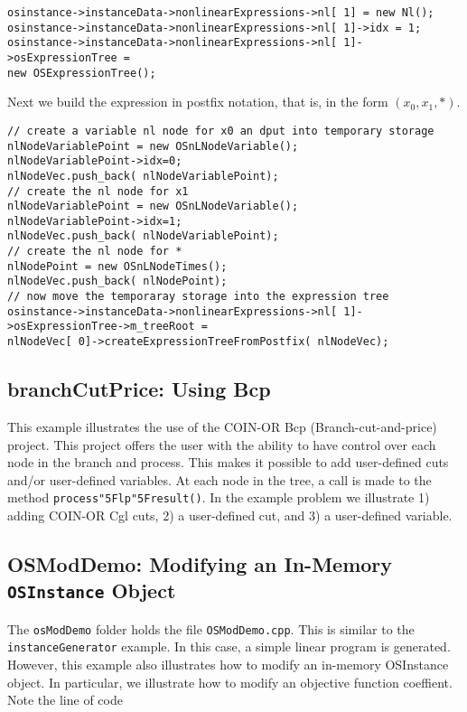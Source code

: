 \documentclass[11pt]{article}
\renewcommand{\_}{{\char"5F}}
\renewcommand{\{}{{\char"7B}}
\renewcommand{\}}{{\char"7D}}
\renewcommand{\^}{{\char"0D}}
\renewcommand{\'}{{\char"0D}}
\begin{document}
\begin{verbatim}
osinstance->instanceData->nonlinearExpressions->nl[ 1] = new Nl();
osinstance->instanceData->nonlinearExpressions->nl[ 1]->idx = 1;
osinstance->instanceData->nonlinearExpressions->nl[ 1]->osExpressionTree =
new OSExpressionTree();
\end{verbatim}

Next we build the expression in postfix notation, that is, in the form $(x_0, x_1, *)$.

\begin{verbatim}
// create a variable nl node for x0 an dput into temporary storage
nlNodeVariablePoint = new OSnLNodeVariable();
nlNodeVariablePoint->idx=0;
nlNodeVec.push_back( nlNodeVariablePoint);
// create the nl node for x1
nlNodeVariablePoint = new OSnLNodeVariable();
nlNodeVariablePoint->idx=1;
nlNodeVec.push_back( nlNodeVariablePoint);
// create the nl node for *
nlNodePoint = new OSnLNodeTimes();
nlNodeVec.push_back( nlNodePoint);
// now move the temporaray storage into the expression tree
osinstance->instanceData->nonlinearExpressions->nl[ 1]->osExpressionTree->m_treeRoot =
nlNodeVec[ 0]->createExpressionTreeFromPostfix( nlNodeVec);
\end{verbatim}





\subsection{branchCutPrice:  Using Bcp}\label{section:examplebranchCutPrice}

This example illustrates the use of the COIN-OR Bcp (Branch-cut-and-price) project.  This project offers the user with the ability to have control over each node in the branch and process. This makes it possible to add user-defined cuts and/or user-defined variables. At each node in the tree, a call is made to the method {\tt process\_lp\_result()}. In the example problem we illustrate 1) adding COIN-OR Cgl cuts, 2) a user-defined cut, and 3) a user-defined variable. 


\subsection{OSModDemo: Modifying an In-Memory {\tt OSInstance} Object}\label{section:exampleOSModDemo}

The {\tt osModDemo} folder holds the file {\tt OSModDemo.cpp}. This is similar to the {\tt instanceGenerator} example.
In this case, a simple linear program is generated. However, this example also illustrates how to modify an in-memory OSInstance object. In particular, we illustrate how to modify an objective function coeffient. Note the line of code 
\end{document}
